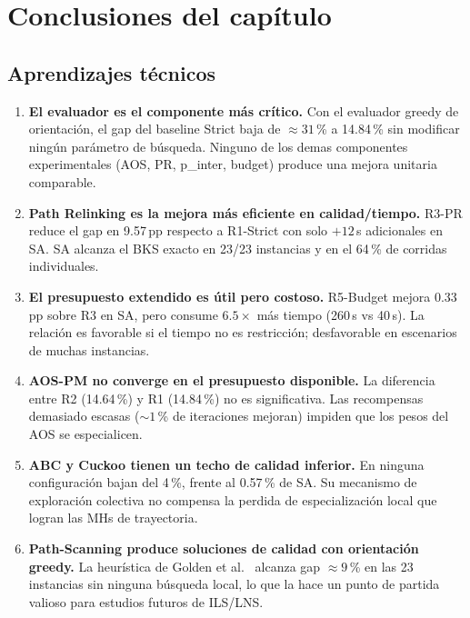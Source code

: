 \section{Conclusiones del capítulo}
\label{sec:conclusiones}

\subsection{Aprendizajes técnicos}

\begin{enumerate}
\item \textbf{El evaluador es el componente más crítico.} Con el
  evaluador greedy de orientación, el gap del baseline Strict baja de
  $\approx 31$\,\% a 14.84\,\% sin modificar ningún parámetro de
  búsqueda. Ninguno de los demas componentes experimentales (AOS, PR,
  p\_inter, budget) produce una mejora unitaria comparable.
\item \textbf{Path Relinking es la mejora más eficiente en calidad/tiempo.}
  R3-PR reduce el gap en 9.57\,pp respecto a R1-Strict con solo
  $+12$\,s adicionales en SA. SA alcanza el BKS exacto en 23/23
  instancias y en el 64\,\% de corridas individuales.
\item \textbf{El presupuesto extendido es útil pero costoso.} R5-Budget
  mejora 0.33\,pp sobre R3 en SA, pero consume $6.5\times$ más tiempo
  (260\,s vs 40\,s). La relación es favorable si el tiempo no es
  restricción; desfavorable en escenarios de muchas instancias.
\item \textbf{AOS-PM no converge en el presupuesto disponible.} La
  diferencia entre R2 (14.64\,\%) y R1 (14.84\,\%) no es significativa.
  Las recompensas demasiado escasas ($\sim 1$\,\% de iteraciones mejoran)
  impiden que los pesos del AOS se especialicen.
\item \textbf{ABC y Cuckoo tienen un techo de calidad inferior.} En
  ninguna configuración bajan del 4\,\%, frente al 0.57\,\% de SA.
  Su mecanismo de exploración colectiva no compensa la perdida de
  especialización local que logran las MHs de trayectoria.
\item \textbf{Path-Scanning produce soluciones de calidad con orientación
  greedy.} La heurística de Golden et al.~\cite{golden1983} alcanza gap $\approx 9$\,\%
  en las 23 instancias sin ninguna búsqueda local, lo que la hace
  un punto de partida valioso para estudios futuros de ILS/LNS.
\end{enumerate}

